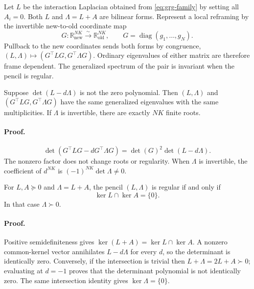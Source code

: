 Let \(L\) be the interaction Laplacian obtained from
\eqref{eq:grg-family} by setting all \(A_i=0\).  Both \(L\) and
\(\Lambda=L+A\) are bilinear forms.  Represent a local reframing by the
invertible new-to-old coordinate map
\[
G:\mathbb R_{\mathrm{new}}^{NK}\xrightarrow{\sim}
\mathbb R_{\mathrm{old}}^{NK},
\qquad
G=\operatorname{diag}(g_1,\ldots,g_N).
\]
Pullback to the new coordinates sends both forms by congruence,
\((L,\Lambda)\mapsto(G^\top LG,G^\top\Lambda G)\).
Ordinary eigenvalues of either matrix are therefore frame dependent.  The
generalized spectrum of the pair is invariant when the pencil is regular.

Suppose \(\det(L-d\Lambda)\) is not the zero polynomial.  Then
\((L,\Lambda)\) and
\((G^\top LG,G^\top\Lambda G)\) have the same generalized eigenvalues with
the same multiplicities.  If \(\Lambda\) is invertible, there are exactly
\(NK\) finite roots. 

\paragraph{Proof.}
\begin{equation}
\det(G^\top LG-dG^\top\Lambda G)
=\det(G)^2\det(L-d\Lambda).
\label{eq:grg-pencil-congruence}
\end{equation}
The nonzero factor does not change roots or regularity.  When
\(\Lambda\) is invertible, the coefficient of \(d^{NK}\) is
\((-1)^{NK}\det\Lambda\ne0\).

For \(L,A\succeq0\) and \(\Lambda=L+A\), the pencil
\((L,\Lambda)\) is regular if and only if
\begin{equation}
\ker L\cap\ker A=\{0\}.
\label{eq:grg-regularity}
\end{equation}
In that case \(\Lambda\succ0\). 

\paragraph{Proof.}
Positive semidefiniteness gives
\(\ker(L+A)=\ker L\cap\ker A\).  A nonzero common-kernel vector annihilates
\(L-d\Lambda\) for every \(d\), so the determinant is identically zero.
Conversely, if the intersection is trivial then
\(L+\Lambda=2L+A\succ0\); evaluating at \(d=-1\) proves that the determinant
polynomial is not identically zero.  The same intersection identity gives
\(\ker\Lambda=\{0\}\).

